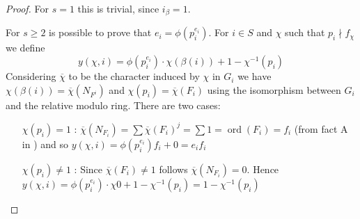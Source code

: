 \documentclass[]{article}
\theoremstyle{plain}
\theoremstyle{remark}
\theoremstyle{definition}
\DeclareMathOperator{\ord}{ord}
\begin{document}
	\begin{proof}
		For $ s=1 $ this is trivial, since $ i_\beta = 1 $. 
		
		For $ s \geq 2 $ is possible to prove that $ e_i = \phi ( p_i ^ {e_i}) $. For $ i \in S$ and $ \chi $ such that $ p_i \nmid f_\chi $ we define
		 \[ y(\chi , i) = \phi(p_i^{e_i}) \cdot \chi (\beta (i))  + 1- \chi^{-1} (p_i) \]
		Considering $ \overline{\chi} $ to be the character induced by $ \chi $ in $ G_i$ we have $ \chi(\beta(i)) = \overline{\chi}(N_{F^i})  $ and $ \chi (p_i) = \overline{\chi}(F_i) $ using the isomorphism between $ G_i $ and the relative modulo ring. There are two cases: 
		\begin{itemize}
		\item[$ \chi(p_i) = 1 $ :] $ \overline{\chi}(N_{F_i}) = \sum \overline{\chi}(F_i)^j = \sum 1 = \ord (F_i) = f_i$ (from fact A in \cite[Page~544]{RIN}) and so $ y(\chi , i) = \phi(p_i^{e_i})f_i + 0 = e_i f_i $
		\item[$ \chi(p_i) \neq 1 $ :] Since $ \overline{\chi}({F_i})  \neq 1 $ follows $ \overline{\chi}(N_{F_i}) = 0 $. %
		Hence $ y(\chi , i) = \phi(p_i^{e_i}) \cdot \chi 0  + 1- \chi^{-1} (p_i)= 1- \chi^{-1} (p_i) $
		
		\end{itemize}
	\end{proof}
	
	
	\newpage
	\printbibliography
\end{document}
